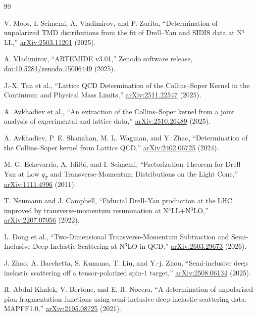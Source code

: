 \documentclass[11pt]{article}
\begin{document}
\begin{thebibliography}{99}

V. Moos, I. Scimemi, A. Vladimirov, and P. Zurita,
``Determination of unpolarized TMD distributions from the fit of Drell--Yan and SIDIS data at N\(^4\)LL,''
\href{https://arxiv.org/abs/2503.11201}{arXiv:2503.11201} (2025).

A. Vladimirov,
``ARTEMIDE v3.01,'' Zenodo software release,
\href{https://doi.org/10.5281/zenodo.15006449}{doi:10.5281/zenodo.15006449} (2025).

J.-X. Tan et al.,
``Lattice QCD Determination of the Collins--Soper Kernel in the Continuum and Physical Mass Limits,''
\href{https://arxiv.org/abs/2511.22547}{arXiv:2511.22547} (2025).

A. Avkhadiev et al.,
``An extraction of the Collins--Soper kernel from a joint analysis of experimental and lattice data,''
\href{https://arxiv.org/abs/2510.26489}{arXiv:2510.26489} (2025).

A. Avkhadiev, P. E. Shanahan, M. L. Wagman, and Y. Zhao,
``Determination of the Collins--Soper kernel from Lattice QCD,''
\href{https://arxiv.org/abs/2402.06725}{arXiv:2402.06725} (2024).

M. G. Echevarria, A. Idilbi, and I. Scimemi,
``Factorization Theorem for Drell--Yan at Low \(q_T\) and Transverse-Momentum Distributions on the Light Cone,''
\href{https://arxiv.org/abs/1111.4996}{arXiv:1111.4996} (2011).

T. Neumann and J. Campbell,
``Fiducial Drell--Yan production at the LHC improved by transverse-momentum resummation at N\(^4\)LL+N\(^3\)LO,''
\href{https://arxiv.org/abs/2207.07056}{arXiv:2207.07056} (2022).

L. Dong et al.,
``Two-Dimensional Transverse-Momentum Subtraction and Semi-Inclusive Deep-Inelastic Scattering at N\(^3\)LO in QCD,''
\href{https://arxiv.org/abs/2603.29673}{arXiv:2603.29673} (2026).

J. Zhao, A. Bacchetta, S. Kumano, T. Liu, and Y.-j. Zhou,
``Semi-inclusive deep inelastic scattering off a tensor-polarized spin-1 target,''
\href{https://arxiv.org/abs/2508.06134}{arXiv:2508.06134} (2025).

R. Abdul Khalek, V. Bertone, and E. R. Nocera,
``A determination of unpolarised pion fragmentation functions using semi-inclusive deep-inelastic-scattering data: MAPFF1.0,''
\href{https://arxiv.org/abs/2105.08725}{arXiv:2105.08725} (2021).


\end{thebibliography}
\end{document}
